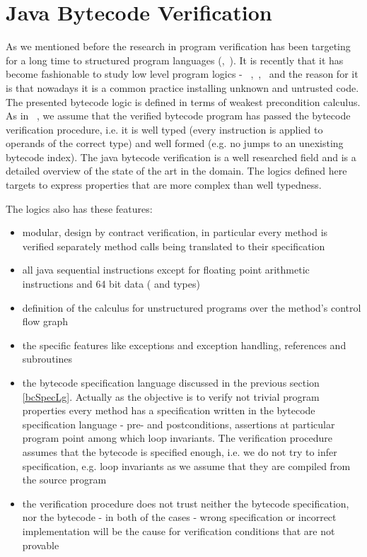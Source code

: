 
\section{Java Bytecode Verification}\label{verifCond}
As we mentioned before the research in program verification has been targeting for a long time to structured program languages (\cite{WPCDS},~\cite{DisDij}). It is recently that it has become fashionable to study low level program logics -  ~\cite{B04tlsj},~\cite{BM05plb},~\cite{Quigley} and the reason for it is that nowadays it is a common practice installing unknown and untrusted code. The presented bytecode logic is defined in terms of weakest precondition calculus. As in ~\cite{BM05plb}, we assume that the verified bytecode program has passed the bytecode verification procedure, i.e. it is well typed (every instruction is applied to operands of the correct type) and well formed (e.g. no jumps to an unexisting bytecode index). The java bytecode verification is a well researched field and \cite{Ljbc} is a detailed overview of the state of the art in the domain. The logics defined here targets to express properties that are more complex than well typedness.

The logics also has these features:
\begin{itemize}
\item modular, design by contract verification, in particular every method is verified separately method calls being translated to their specification 
\item all java sequential instructions except for floating point arithmetic instructions and 64 bit data ( and  types)
\item definition of the calculus for unstructured programs over the method's control flow graph
\item the specific features like exceptions and exception handling, references and subroutines
\item the bytecode specification language discussed in the previous section \ref{bcSpecLg}. Actually as the objective is to verify not trivial program properties every method has a specification written in the bytecode specification language - pre- and postconditions, assertions at particular program point among which loop invariants. The verification procedure assumes that the bytecode is specified enough, i.e. we do not try to infer specification, e.g. loop invariants as we assume that they are compiled from the source program
\item the verification procedure does not trust neither the bytecode specification, nor the bytecode - in both of the cases - wrong specification or incorrect implementation will be the cause for verification conditions that are not provable 
\end{itemize}

